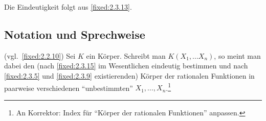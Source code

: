 Die Eindeutigkeit folgt aus \ref{fixed:2.3.13}.

\subsection{Notation und Sprechweise} (vgl.~\ref{fixed:2.2.10}) Sei $K$ ein Körper. Schreibt man $K(X_1,...X_n)$, so meint man dabei den (nach \ref{fixed:2.3.15} im Wesentlichen eindeutig bestimmen und nach \ref{fixed:2.3.5} und \ref{fixed:2.3.9} existierenden) Körper der rationalen Funktionen in paarweise verschiedenen "`unbestimmten"' $X_1,...,X_n$.\footnote{An Korrektor: Index für "`Körper der rationalen Funktionen"' anpassen.}
